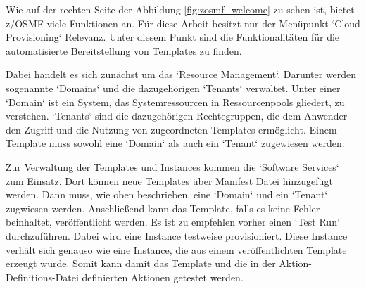 Wie auf der rechten Seite der Abbildung \ref{fig:zosmf_welcome} zu sehen ist, bietet z/OSMF viele Funktionen an.
Für diese Arbeit besitzt nur der Menüpunkt `Cloud Provisioning` Relevanz.
Unter diesem Punkt sind die Funktionalitäten für die automatisierte Bereitstellung von Templates zu finden.
\cite{Rotthove.2018}

Dabei handelt es sich zunächst um das `Resource Management`.
Darunter werden sogenannte `Domains` und die dazugehörigen `Tenants` verwaltet.
Unter einer `Domain` ist ein System, das Systemressourcen in Ressourcenpools gliedert, zu verstehen.
`Tenants` sind die dazugehörigen Rechtegruppen, die dem Anwender den Zugriff und die Nutzung von zugeordneten Templates ermöglicht.
Einem Template muss sowohl eine `Domain` als auch ein `Tenant` zugewiesen werden.
\cite{Rotthove.2018}

Zur Verwaltung der Templates und Instances kommen die `Software Services` zum Einsatz.
Dort können neue Templates über Manifest Datei hinzugefügt werden.
Dann muss, wie oben beschrieben, eine `Domain` und ein `Tenant` zugwiesen werden.
Anschließend kann das Template, falls es keine Fehler beinhaltet, veröffentlicht werden.
Es ist zu empfehlen vorher einen `Test Run` durchzuführen.
Dabei wird eine Instance testweise provisioniert.
Diese Instance verhält sich genauso wie eine Instance, die aus einem veröffentlichten Template erzeugt wurde.
Somit kann damit das Template und die in der Aktion-Definitions-Datei definierten Aktionen getestet werden.
\cite{Rotthove.2018}
